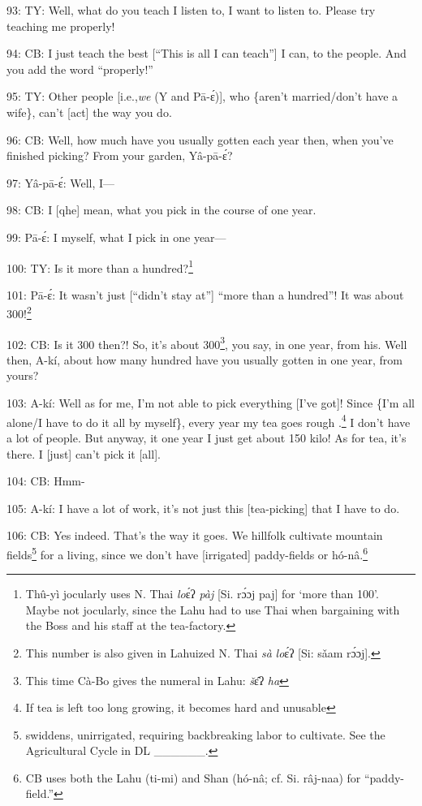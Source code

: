 93: TY: Well, what do you teach I listen to, I want to listen to.  Please try teaching
me properly!

94: CB: I just teach the best [``This is all I can teach''] I can, to the people.
And you add the word ``properly!''

95: TY: Other people [i.e.,\textit{we} (Y and Pā-ɛ́)], who \{aren't married/don't
have a wife\}, can't [act] the way you do.

96: CB: Well, how much have you usually gotten each year then, when you've finished
picking?  From your garden, Yâ-pā-ɛ́?

97: Yâ-pā-ɛ́: Well, I---

98: CB: I [qhe] mean, what you pick in the course of one year.

99: Pā-ɛ́: I myself, what I pick in one year---

100: TY: Is it more than a hundred?\footnote{Thû-yì jocularly uses N. Thai \textit{lo}ɛ́ʔ\textit{ pàj} [Si. rɔ́ɔj paj] for `more than 100'. Maybe not jocularly, since the Lahu had to use Thai when bargaining with the Boss and his staff at the tea-factory.}

101: Pā-ɛ́: It wasn't just [``didn't stay at''] ``more than a hundred''!  It
was about 300!\footnote{This number is also given in Lahuized N. Thai \textit{sà} \textit{lo}ɛ́ʔ\textit{ }[Si: sǎam rɔ́ɔj].}

102: CB: Is it 300 then?!  So, it's about 300\footnote{This time Cà-Bo gives the numeral in Lahu: \textit{š}ɛ̂ʔ\textit{ ha}}, you say, in one year, from his.
Well then, A-kí, about how many hundred have you usually gotten in one year,
from yours?

103: A-kí: Well as for me, I'm not able to pick everything [I've got]!  Since
\{I'm all alone/I have to do it all by myself\}, every year my tea goes rough .\footnote{If tea is left too long growing, it becomes hard and unusable}
I don't have a lot of people.  But anyway, it one year I just get about 150 kilo!
As for tea, it's there.  I [just] can't pick it [all].

104: CB: Hmm-

105: A-kí: I have a lot of work, it's not just this [tea-picking] that I have
to do.

106: CB: Yes indeed.  That's the way it goes.  We hillfolk cultivate mountain fields\footnote{swiddens, unirrigated, requiring backbreaking labor to cultivate.  See the Agricultural Cycle in DL \_\_\_\_\_\_.}
for a living, since we don't have [irrigated] paddy-fields or hó-nâ.\footnote{CB uses both the Lahu (ti-mi) and Shan (hó-nâ; cf. Si. râj-naa) for ``paddy-field.''}

